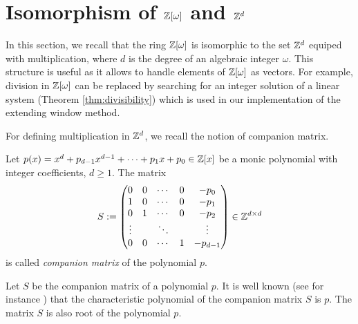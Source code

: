 


\section{\texorpdfstring{Isomorphism of $\mathbb{Z}[\omega]$ and $\mathbb{Z}^{d}$}{Isomorphism of Z[omega] and Zd}}
In this section, we recall that  the ring $\mathbb{Z}[\omega]$ is isomorphic to the set $\mathbb{Z}^d$ equiped with multiplication, where $d$ is the degree of an algebraic integer $\omega$. This structure is useful as it allows to handle elements of $\mathbb{Z}[\omega]$ as vectors. For example, division in $\mathbb{Z}[\omega]$ can be replaced by searching for an integer solution of a linear system (Theorem \ref{thm:divisibility}) which is used in our implementation of the extending window method.


For defining multiplication in $\mathbb{Z}^d$, we recall the notion of companion matrix. 
\begin{defn}
Let  $p(x)=x^d +p_{d-1}x^{d-1}+ \cdots + p_1 x+p_0 \in \mathbb{Z}[x]$ be a monic polynomial with integer coefficients, $d\geq 1$. The matrix 
$$
S := \begin{pmatrix}
            0 & 0 & \cdots & 0 & -p_0 \\
            1 & 0 & \cdots & 0 & -p_1 \\
            0 & 1 & \cdots & 0 & -p_2 \\
            \vdots &   & \ddots & & \vdots \\
            0 & 0 & \cdots & 1 & -p_{d-1} 
            \end{pmatrix} \in \mathbb{Z}^{d\times d}
$$
is called \emph{companion matrix} of the polynomial $p$.
\end{defn}
Let $S$ be the companion matrix of a polynomial $p$. It is well known (see for instance \cite{horn}) that the characteristic polynomial of the companion matrix $S$ is $p$. The matrix $S$ is also root of the polynomial $p$.


